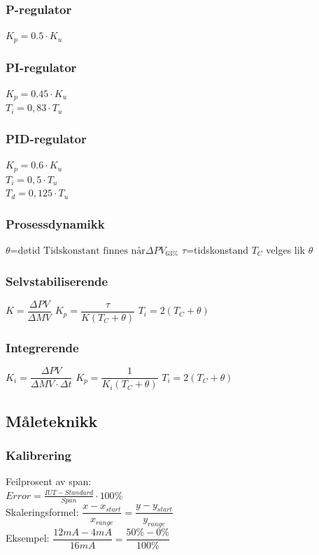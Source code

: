 \documentclass[10pt,a5paper]{article}
\begin{document}
\subsubsection*{P-regulator}
$K_p = 0.5\cdot K_u$
\subsubsection*{PI-regulator}
$K_p = 0.45\cdot K_u$\\
$T_i = 0,83\cdot T_u$\\
\subsubsection*{PID-regulator}
$K_p = 0.6\cdot K_u$\\
$T_i = 0,5\cdot T_u$\\
$T_d = 0,125\cdot T_u$\\
\vskip 2.5pt 
\subsubsection*{Prosessdynamikk}
\vskip 2.5pt 
$\theta$=døtid
\vskip 2.5pt 
$ \text{Tidskonstant finnes når} \Delta PV_{63\%}$
\vskip 2.5pt 
$\tau$=tidskonstand
\vskip 2.5pt 
$T_C$ velges lik $\theta$
\vskip 2.5pt 
\subsubsection*{Selvstabiliserende}
\vskip 2.5pt 
$K=\dfrac{\Delta PV}{\Delta MV} $
\vskip 2.5pt 
$K_p=\dfrac{\tau}{K(T_C+\theta)}$
\vskip 2.5pt 
$T_i=2(T_C+\theta)$
\vskip 2.5pt 
\subsubsection*{Integrerende}
\vskip 2.5pt 
$K_i=\dfrac{\Delta PV}{\Delta MV \cdot {\Delta t}}$
\vskip 2.5pt 
$K_p=\dfrac{1}{K_i(T_C+\theta)}$
\vskip 2.5pt 
$T_i=2(T_C+\theta)$\\
\subsection{Måleteknikk}
\subsubsection*{Kalibrering}
Feilprosent av span:\\
$Error=\frac {IUT-Standard}{Span} \cdot 100\% $\\
\vskip 2.5pt 
Skaleringsformel:
\vskip 2.5pt 
$\dfrac{x-x_{start}}{x_{range}}=\dfrac{y-y_{start}}{y_{range}}$\\
Eksempel: $\dfrac{12mA-4mA}{16mA}=\dfrac{50\%-0\%}{100\%}$
\end{document}
